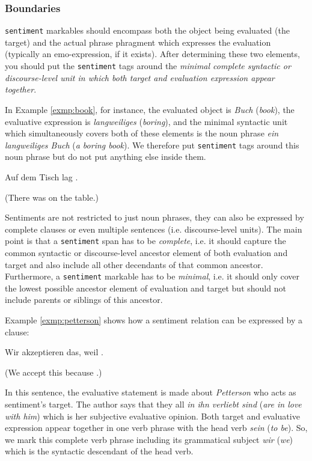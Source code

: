 \subsubsection{Boundaries} \texttt{sentiment} markables should
encompass both the object being evaluated (the target) and the actual
phrase phragment which expresses the evaluation (typically an
emo-expression, if it exists).  After determining these two elements,
you should put the \texttt{sentiment} tags around the \emph{minimal
  complete syntactic or discourse-level unit in which both target and
  evaluation expression appear together}.

In Example \ref{exmp:book}, for instance, the evaluated object is
\textit{Buch} (\textit{book}), the evaluative expression is
\textit{langweiliges} (\textit{boring}), and the minimal syntactic unit which
simultaneously covers both of these elements is the noun phrase \textit{ein
  langweiliges Buch} (\textit{a boring book}).  We therefore put
\texttt{sentiment} tags around this noun phrase but do not put anything else
inside them.
\begin{example}
  Auf dem Tisch lag .

  (There was  on the table.)\label{exmp:book}
\end{example}
Sentiments are not restricted to just noun phrases, they can also be
expressed by complete clauses or even multiple sentences
(i.e. discourse-level units).  The main point is that a
\texttt{sentiment} span has to be \emph{complete}, i.e. it should
capture the common syntactic or discourse-level ancestor element of
both evaluation and target and also include all other decendants of
that common ancestor.  Furthermore, a \texttt{sentiment} markable has
to be \emph{minimal}, i.e. it should only cover the lowest possible
ancestor element of evaluation and target but should not include
parents or siblings of this ancestor.

Example \ref{exmp:petterson} shows how a sentiment relation can be
expressed by a clause:
\begin{example}
  Wir akzeptieren das, weil .

  (We accept this because .)\label{exmp:petterson}
\end{example}
\noindent In this sentence, the evaluative statement is made about
\textit{Petterson} who acts as sentiment's target.  The author says
that they all \textit{in ihn verliebt sind} (\textit{are in love with
  him}) which is her subjective evaluative opinion.  Both target and
evaluative expression appear together in one verb phrase with the head
verb \textit{sein} (\textit{to be}).  So, we mark this complete verb
phrase including its grammatical subject \textit{wir} (\textit{we})
which is the syntactic descendant of the head verb.

